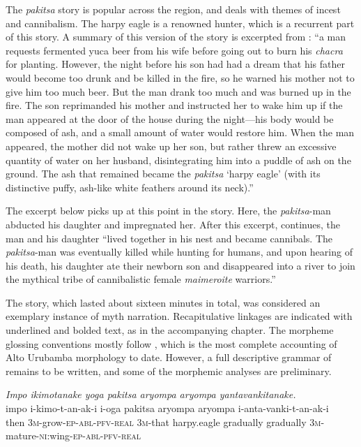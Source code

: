 \documentclass[output=paper]{LSP/langsci}
\begin{document}
The \textit{pakitsa} story is popular across the region, and deals with themes of incest and cannibalism. The harpy eagle is a renowned hunter, which is a recurrent part of this story. A summary of this version of the story is excerpted from \citet[][255--256]{emlen14}: ``a man requests fermented yuca beer from his wife before going out to burn his \textit{chacra} for planting. However, the night before his son had had a dream that his father would become too drunk and be killed in the fire, so he warned his mother not to give him too much beer. But the man drank too much and was burned up in the fire. The son reprimanded his mother and instructed her to wake him up if the man appeared at the door of the house during the night—his body would be composed of ash, and a small amount of water would restore him. When the man appeared, the mother did not wake up her son, but rather threw an excessive quantity of water on her husband, disintegrating him into a puddle of ash on the ground. The ash that remained became the \textit{pakitsa} `harpy eagle' (with its distinctive puffy, ash-like white feathers around its neck).'' 

The excerpt below picks up at this point in the story. Here, the \textit{pakitsa}-man abducted his daughter and impregnated her. After this excerpt, \citet[][256]{emlen14} continues, the man and his daughter ``lived together in his nest and became cannibals. The \textit{pakitsa}-man was eventually killed while hunting for humans, and upon hearing of his death, his daughter ate their newborn son and disappeared into a river to join the mythical tribe of cannibalistic female \textit{maimeroite} warriors.'' 

The story, which lasted about sixteen minutes in total, was considered an exemplary instance of myth narration. Recapitulative linkages are indicated with underlined and bolded text, as in the accompanying chapter. The morpheme glossing conventions mostly follow \citet{vargas13}, which is the most complete accounting of {Alto Urubamba}  morphology to date. However, a full descriptive grammar of  remains to be written, and some of the morphemic analyses are preliminary.


\begin{exe}
\ex \label{Emapp01}
\glt \textit{Impo ikimotanake yoga pakitsa aryompa aryompa yantavankitanake.}\\
\gll impo i-kimo-t-an-ak-i i-oga pakitsa aryompa aryompa i-anta-vanki-t-an-ak-i\\
then \textsc{3m-}grow\textsc{-ep-abl-pfv-real} \textsc{3m-}that harpy.eagle gradually gradually \textsc{3m-}mature-\textsc{ni:}wing\textsc{-ep-abl-pfv-real}\\
\glt {}\\
\end{exe}
\end{document}
